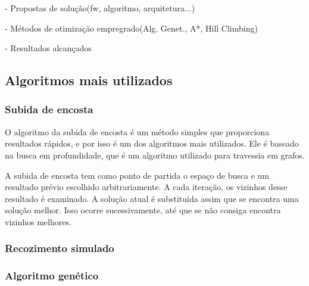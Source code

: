 - Propostas de solução(fw, algoritmo, arquitetura...)

- Métodos de otimização empregrado(Alg. Genet., A*, Hill Climbing)

- Resultados alcançados

\subsection{Algoritmos mais utilizados}

\subsubsection{Subida de encosta}

O algoritmo da subida de encosta é um método simples que proporciona resultados rápidos, e por isso é um dos algoritmos mais utilizados. Ele é baseado na busca em profundidade, que é um algoritmo utilizado para travessia em grafos. 

A subida de encosta tem como ponto de partida o espaço de busca e um resultado prévio escolhido arbitrariamente. A cada iteração, os vizinhos desse resultado é examinado. A solução atual é substituída assim que se encontra uma solução melhor. Isso ocorre sucessivamente, até que se não consiga encontra vizinhos melhores.  

\subsubsection{Recozimento simulado}

\subsubsection{Algoritmo genético}








